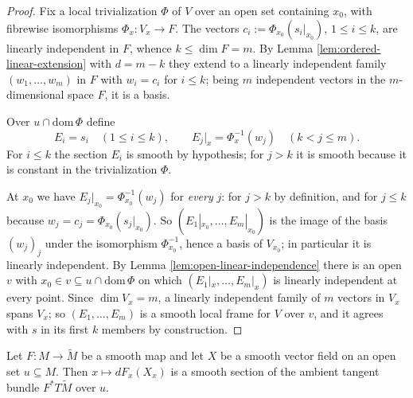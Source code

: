 \begin{proof}
\leanok
Fix a local trivialization $\Phi$ of $V$ over an open set containing $x_0$, with fibrewise isomorphisms $\Phi_x : V_x \to F$. The vectors $c_i := \Phi_{x_0}(s_i|_{x_0})$, $1 \leq i \leq k$, are linearly independent in $F$, whence $k \leq \dim F = m$. By Lemma \ref{lem:ordered-linear-extension} with $d = m - k$ they extend to a linearly independent family $(w_1, \ldots, w_m)$ in $F$ with $w_i = c_i$ for $i \leq k$; being $m$ independent vectors in the $m$-dimensional space $F$, it is a basis.

Over $u \cap \mathrm{dom}\,\Phi$ define
\[
E_i = s_i \quad (1 \leq i \leq k), \qquad E_j|_x = \Phi_x^{-1}(w_j) \quad (k < j \leq m).
\]
For $i \leq k$ the section $E_i$ is smooth by hypothesis; for $j > k$ it is smooth because it is constant in the trivialization $\Phi$.

At $x_0$ we have $E_j|_{x_0} = \Phi_{x_0}^{-1}(w_j)$ for \emph{every} $j$: for $j > k$ by definition, and for $j \leq k$ because $w_j = c_j = \Phi_{x_0}(s_j|_{x_0})$. So $(E_1|_{x_0}, \ldots, E_m|_{x_0})$ is the image of the basis $(w_j)_j$ under the isomorphism $\Phi_{x_0}^{-1}$, hence a basis of $V_{x_0}$; in particular it is linearly independent. By Lemma \ref{lem:open-linear-independence} there is an open $v$ with $x_0 \in v \subseteq u \cap \mathrm{dom}\,\Phi$ on which $(E_1|_x, \ldots, E_m|_x)$ is linearly independent at every point. Since $\dim V_x = m$, a linearly independent family of $m$ vectors in $V_x$ spans $V_x$; so $(E_1, \ldots, E_m)$ is a smooth local frame for $V$ over $v$, and it agrees with $s$ in its first $k$ members by construction.
\end{proof}

\begin{lemma}
\label{lem:pushforward-smooth}
\leanok
{}
Let $F : M \to \tilde{M}$ be a smooth map and let $X$ be a smooth vector field on an open set $u \subseteq M$. Then $x \mapsto dF_x(X_x)$ is a smooth section of the ambient tangent bundle $F^* T\tilde{M}$ over $u$.
\end{lemma}

